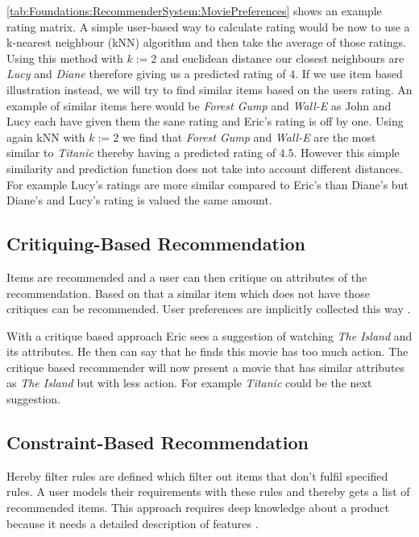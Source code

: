 \autoref{tab:Foundations:RecommenderSystem:MoviePreferences} shows an example rating matrix. A simple user-based way to calculate rating would be now to use a k-nearest neighbour (kNN) algorithm and then take the average of those ratings. Using this method with $k := 2$ and euclidean distance our closest neighbours are \textit{Lucy} and \textit{Diane} therefore giving us a predicted rating of $4$.  If we use item based illustration instead, we will try to find similar items based on the users rating. An example of similar items here would be \textit{Forest Gump} and \textit{Wall-E} as John and Lucy each have given them the sane rating and Eric's rating is off by one. Using again kNN with $k := 2$ we find that \textit{Forest Gump} and \textit{Wall-E} are the most similar to \textit{Titanic} thereby having a predicted rating of $4.5$.
However this simple similarity and prediction function does not take into account different distances. For example Lucy's ratings are more similar compared to Eric's than Diane's but Diane's and Lucy's rating is valued the same amount.

\subsection{Critiquing-Based Recommendation}
Items are recommended and a user can then critique on attributes of the recommendation. Based on that a similar item which does not have those critiques can be recommended. User preferences are implicitly collected this way \cite{knijnenburgEachHisOwn2011}.

With a critique based approach Eric sees a suggestion of watching \textit{The Island} and its attributes. He then can say that he finds this movie has too much action. The critique based recommender will now present a movie that has similar attributes as \textit{The Island} but with less action. For example \textit{Titanic} could be the next suggestion.

\subsection{Constraint-Based Recommendation}
Hereby filter rules are defined which filter out items that don't fulfil specified rules. A user models their requirements with these rules and thereby gets a list of recommended items. This approach requires deep knowledge about a product because it needs a detailed description of features  \cite[~ p. 12]{felfernigDecisionTasksBasic2018}.

